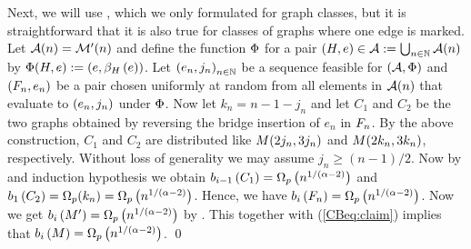 Next, we will use , which we only formulated for graph classes, but it is straightforward that it is also true for classes of graphs where one edge is marked. Let $\mathcal{A}(n)=\mathcal{M}'(n)$ and define the function $\Phi$ for a pair $(H, e) \in \mathcal{A}:=\bigcup_{n\in\mathbb{N}} \mathcal{A}(n)$ by $\Phi(H, e):=\left(e, \beta_{H}\left(e\right)\right)$. Let $\left(e_n, j_n\right)_{n\in \mathbb{N}}$ be a sequence feasible for $\left(\mathcal{A}, \Phi\right)$ and $(F_n, e_n)$ be a pair chosen uniformly at random from all elements in $\mathcal{A}(n)$ that evaluate to $\left(e_n, j_n\right)$ under $\Phi$. Now let $k_n=n-1-j_n$ and let $C_1$ and $C_2$ be the two graphs obtained by reversing the bridge insertion of $e_n$ in $F_n$. By the above construction, $C_1$ and $C_2$ are distributed like $M(2j_n, 3j_n)$ and $M(2k_n, 3k_n)$, respectively. Without loss of generality we may assume $j_n\geq (n-1)/2$. Now by  and induction hypothesis we obtain $b_{i-1}\left(C_1\right)=\Omega_p\left(n^{1/(\alpha-2)}\right)$ and $b_{1}\left(C_2\right)=\Omega_p(k_n)=\Omega_p\left(n^{1/(\alpha-2)}\right)$. Hence, we have $b_{i}\left(F_n\right)=\Omega_p\left(n^{1/(\alpha-2)}\right)$. Now we get $b_{i}\left(M'\right)=\Omega_p\left(n^{1/(\alpha-2)}\right)$ by . This together with (\ref{CBeq:claim}) implies that $b_{i}\left(M\right)=\Omega_p\left(n^{1/(\alpha-2)}\right)$.
\qed

